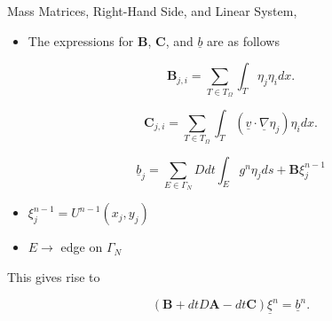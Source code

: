 \documentclass[10pt]{beamer}
\begin{document}
\begin{frame}{ Mass Matrices, Right-Hand Side, and Linear System,}
\begin{itemize}
\item The expressions for $\mathbf{B}$, $\mathbf{C}$, and $\underline{b}$ are as follows
\end{itemize}

\begin{equation}
\mathbf{B}_{j,i} = \sum_{T \in T_{\Omega}} \int_{T} \eta_{j}\eta_{i} dx.
\end{equation}

\begin{equation}
\mathbf{C}_{j,i} = \sum_{T \in T_{\Omega}}\int_{T}\left(\underline{v}\cdot \underline{\nabla}\eta_{j}\right)\eta_{i} dx.
\end{equation}

\begin{equation}
\underline{b}_{j}=\sum_{E \in \Gamma_{N}} Ddt\int_{E}g^{n}\eta_{j}ds+\mathbf{B}\xi_{j}^{n-1}
\end{equation}

\begin{itemize}
\item $\xi_{j}^{n-1} = U^{n-1}\left(x_{j},y_{j}\right)$
\item $E \rightarrow$ edge on $\Gamma_{N}$
\end{itemize}

This gives rise to

\begin{equation}
\left(\mathbf{B}+dtD\mathbf{A}-dt\mathbf{C}\right)\underline{\xi}^{n}=\underline{b}^{n}.
\end{equation}

\end{frame}
\end{document}
